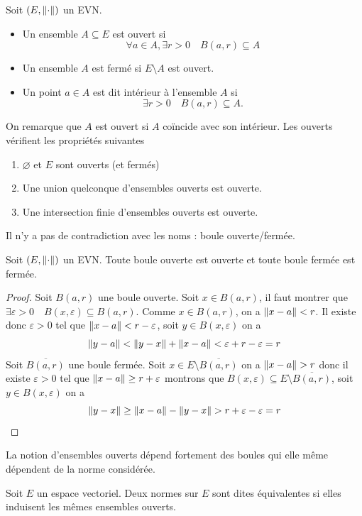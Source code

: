 \begin{definition}
    Soit $(E,\left\| \cdot \right\|)$ un EVN.
    \begin{itemize}
        \item Un ensemble $A\subseteq E$ est ouvert si
        \[
        \forall a\in A, \exists r>0 \quad B(a,r)\subseteq A     \]
        \item Un ensemble $A$ est fermé si $E\setminus A$ est ouvert.
        \item Un point $a\in A$ est dit intérieur à l'ensemble $A$ si
        \[
        \exists r>0 \quad B(a,r)\subseteq A.
        \]
    \end{itemize}
\end{definition}
On remarque que $A$ est ouvert si $A$ coïncide avec son intérieur.
Les ouverts vérifient les propriétés suivantes
\begin{enumerate}
    \item $\varnothing$ et $E$ sont ouverts (et fermés)
    \item Une union quelconque d'ensembles ouverts est ouverte.
    \item Une intersection finie d'ensembles ouverts est ouverte.
\end{enumerate}
Il n'y a pas de contradiction avec les noms : boule ouverte/fermée.
\begin{proposition}
    Soit $(E,\left\| \cdot \right\|)$ un EVN. Toute boule ouverte est ouverte et toute boule fermée est fermée.
\end{proposition}
\begin{proof}
    Soit $B(a,r)$ une boule ouverte. Soit $x\in B(a,r)$, il faut montrer que $\exists\varepsilon >0 \quad B(x,\varepsilon)\subseteq B(a,r)$. Comme $x\in B(a,r)$, on a $\left\| x-a \right\|<r$. Il existe donc $\varepsilon>0$ tel que $\left\| x-a \right\|<r-\varepsilon$, soit $y\in B(x,\varepsilon)$ on a
    \[
    \left\| y-a \right\|< \left\| y-x \right\|+\left\| x-a \right\|<\varepsilon+r-\varepsilon=r
    \]
    Soit $\overline{B(a,r)}$ une boule fermée. Soit $x\in E\setminus\overline{B(a,r)}$ on a $\norm{x-a}>r$ donc il existe $\varepsilon>0$ tel que $\left\| x-a \right\|\geq r+\varepsilon$ montrons que $B(x,\varepsilon)\subseteq E\setminus\overline{B(a,r)}$, soit $y\in B(x,\varepsilon)$ on a
    \[
    \norm{y-x}\geq \norm{x-a}-\norm{y-x}>r+\varepsilon-\varepsilon=r
    \]
\end{proof}
La notion d'ensembles ouverts dépend fortement des boules qui elle même dépendent de la norme considérée.
\begin{definition}
    Soit $E$ un espace vectoriel. Deux normes sur $E$ sont dites équivalentes si elles induisent les mêmes ensembles ouverts. 
    
\end{definition}
